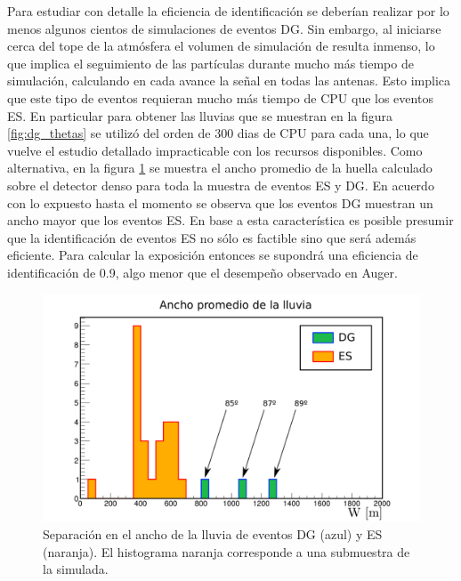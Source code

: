 	Para estudiar con detalle la eficiencia de identificaci\'on se deber\'ian realizar por lo menos algunos cientos de simulaciones de eventos DG. 
	Sin embargo, al iniciarse cerca del tope de la atm\'osfera el volumen de simulaci\'on de \aires{} resulta inmenso, lo que implica el seguimiento de las part\'iculas durante mucho m\'as tiempo de simulaci\'on, calculando en cada avance la se\~nal en todas las antenas.
	Esto implica que este tipo de eventos requieran mucho m\'as tiempo de CPU que los eventos ES.
	En particular para obtener las lluvias que se muestran en la figura \ref{fig:dg_thetas} se utiliz\'o del orden de 300 dias de CPU para cada una, lo que vuelve el estudio detallado impracticable con los recursos disponibles.
	Como alternativa, en la figura \ref{fig:dg_vs_es_Idradio} se muestra el ancho promedio de la huella calculado sobre el detector denso para toda la muestra de eventos ES y DG.
	En acuerdo con lo expuesto hasta el momento se observa que los eventos DG muestran un ancho mayor que los eventos ES.
	En base a esta caracter\'istica es posible presumir que la identificaci\'on de eventos ES no s\'olo es factible sino que ser\'a adem\'as eficiente.
	Para calcular la exposici\'on entonces se supondr\'a una eficiencia de identificaci\'on de 0.9, algo menor que el desempe\~no observado en Auger.
	\begin{figure}[ht!]
		\centering
		\includegraphics[width=\textwidth]{./fig/resultadosRadio/showerWidth_Comp_DG_ES_Wt.pdf}
		\caption{\label{fig:dg_vs_es_Idradio}
		Separaci\'on en el ancho de la lluvia de eventos DG (azul) y ES (naranja). El histograma naranja corresponde a una submuestra de la simulada.
		}
	\end{figure}
	

